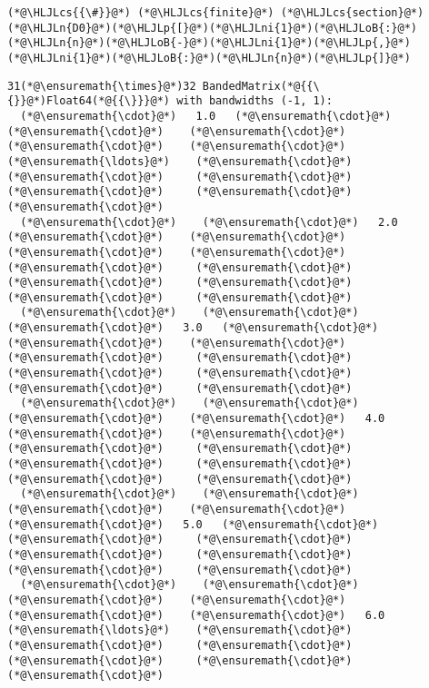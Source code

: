 \documentclass[12pt,a4paper]{article}
\newcommand{\HLJLn}[1]{#1}
\newcommand{\HLJLni}[1]{\textcolor[RGB]{59,151,46}{#1}}
\newcommand{\HLJLoB}[1]{\textcolor[RGB]{102,102,102}{\textbf{#1}}}
\newcommand{\HLJLp}[1]{#1}
\newcommand{\HLJLcs}[1]{\textcolor[RGB]{153,153,119}{\textit{#1}}}
\begin{document}
\begin{lstlisting}
(*@\HLJLcs{{\#}}@*) (*@\HLJLcs{finite}@*) (*@\HLJLcs{section}@*)
(*@\HLJLn{D0}@*)(*@\HLJLp{[}@*)(*@\HLJLni{1}@*)(*@\HLJLoB{:}@*)(*@\HLJLn{n}@*)(*@\HLJLoB{-}@*)(*@\HLJLni{1}@*)(*@\HLJLp{,}@*)(*@\HLJLni{1}@*)(*@\HLJLoB{:}@*)(*@\HLJLn{n}@*)(*@\HLJLp{]}@*)
\end{lstlisting}

\begin{lstlisting}
31(*@\ensuremath{\times}@*)32 BandedMatrix(*@{{\{}}@*)Float64(*@{{\}}}@*) with bandwidths (-1, 1):
  (*@\ensuremath{\cdot}@*)   1.0   (*@\ensuremath{\cdot}@*)    (*@\ensuremath{\cdot}@*)    (*@\ensuremath{\cdot}@*)    (*@\ensuremath{\cdot}@*)    (*@\ensuremath{\cdot}@*)   (*@\ensuremath{\ldots}@*)    (*@\ensuremath{\cdot}@*)     (*@\ensuremath{\cdot}@*)     (*@\ensuremath{\cdot}@*)     (*@\ensuremath{\cdot}@*)     (*@\ensuremath{\cdot}@*)     (*@\ensuremath{\cdot}@*) 
  (*@\ensuremath{\cdot}@*)    (*@\ensuremath{\cdot}@*)   2.0   (*@\ensuremath{\cdot}@*)    (*@\ensuremath{\cdot}@*)    (*@\ensuremath{\cdot}@*)    (*@\ensuremath{\cdot}@*)        (*@\ensuremath{\cdot}@*)     (*@\ensuremath{\cdot}@*)     (*@\ensuremath{\cdot}@*)     (*@\ensuremath{\cdot}@*)     (*@\ensuremath{\cdot}@*)     (*@\ensuremath{\cdot}@*) 
  (*@\ensuremath{\cdot}@*)    (*@\ensuremath{\cdot}@*)    (*@\ensuremath{\cdot}@*)   3.0   (*@\ensuremath{\cdot}@*)    (*@\ensuremath{\cdot}@*)    (*@\ensuremath{\cdot}@*)        (*@\ensuremath{\cdot}@*)     (*@\ensuremath{\cdot}@*)     (*@\ensuremath{\cdot}@*)     (*@\ensuremath{\cdot}@*)     (*@\ensuremath{\cdot}@*)     (*@\ensuremath{\cdot}@*) 
  (*@\ensuremath{\cdot}@*)    (*@\ensuremath{\cdot}@*)    (*@\ensuremath{\cdot}@*)    (*@\ensuremath{\cdot}@*)   4.0   (*@\ensuremath{\cdot}@*)    (*@\ensuremath{\cdot}@*)        (*@\ensuremath{\cdot}@*)     (*@\ensuremath{\cdot}@*)     (*@\ensuremath{\cdot}@*)     (*@\ensuremath{\cdot}@*)     (*@\ensuremath{\cdot}@*)     (*@\ensuremath{\cdot}@*) 
  (*@\ensuremath{\cdot}@*)    (*@\ensuremath{\cdot}@*)    (*@\ensuremath{\cdot}@*)    (*@\ensuremath{\cdot}@*)    (*@\ensuremath{\cdot}@*)   5.0   (*@\ensuremath{\cdot}@*)        (*@\ensuremath{\cdot}@*)     (*@\ensuremath{\cdot}@*)     (*@\ensuremath{\cdot}@*)     (*@\ensuremath{\cdot}@*)     (*@\ensuremath{\cdot}@*)     (*@\ensuremath{\cdot}@*) 
  (*@\ensuremath{\cdot}@*)    (*@\ensuremath{\cdot}@*)    (*@\ensuremath{\cdot}@*)    (*@\ensuremath{\cdot}@*)    (*@\ensuremath{\cdot}@*)    (*@\ensuremath{\cdot}@*)   6.0  (*@\ensuremath{\ldots}@*)    (*@\ensuremath{\cdot}@*)     (*@\ensuremath{\cdot}@*)     (*@\ensuremath{\cdot}@*)     (*@\ensuremath{\cdot}@*)     (*@\ensuremath{\cdot}@*)     (*@\ensuremath{\cdot}@*) 

\end{lstlisting}
\end{document}
